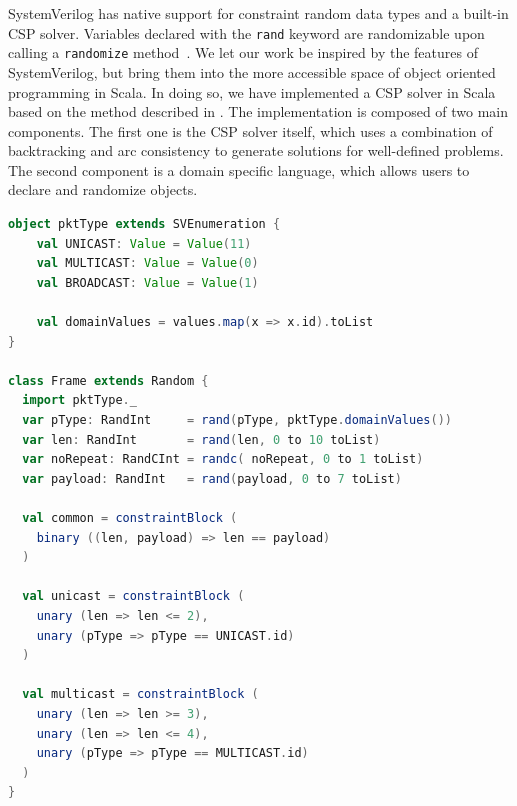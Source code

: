 \documentclass[runningheads]{llncs}
\newcommand{\code}[1]{{\small{\texttt{#1}}}}
\begin{document}

SystemVerilog has native support for constraint random data types and a built-in CSP solver. Variables declared with the \texttt{rand} keyword are randomizable upon calling a \texttt{randomize} method~\cite{spear2008systemverilog}. We let our work be inspired by the features of SystemVerilog, but bring them into the more accessible space of object oriented programming in Scala. In doing so, we have implemented a CSP solver in Scala based on the method described in \cite{russell2002artificial}. The implementation is composed of two main components. The first one is the CSP solver itself, which uses a combination of backtracking and arc consistency to generate solutions for well-defined problems. The second component is a domain specific language, which allows users to declare and randomize objects.

\begin{lstlisting}[language=scala, caption={Random object in Scala}, label={lst:randobjscala}]
object pktType extends SVEnumeration {
    val UNICAST: Value = Value(11)
    val MULTICAST: Value = Value(0)
    val BROADCAST: Value = Value(1)
    
    val domainValues = values.map(x => x.id).toList
}

class Frame extends Random {
  import pktType._
  var pType: RandInt     = rand(pType, pktType.domainValues())
  var len: RandInt       = rand(len, 0 to 10 toList)
  var noRepeat: RandCInt = randc( noRepeat, 0 to 1 toList)
  var payload: RandInt   = rand(payload, 0 to 7 toList)

  val common = constraintBlock (
    binary ((len, payload) => len == payload)
  )

  val unicast = constraintBlock (
    unary (len => len <= 2),
    unary (pType => pType == UNICAST.id)
  )

  val multicast = constraintBlock (
    unary (len => len >= 3),
    unary (len => len <= 4),
    unary (pType => pType == MULTICAST.id)
  )
}
\end{lstlisting}
\end{document}
